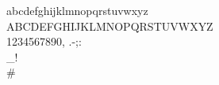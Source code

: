 \documentclass[preview]{standalone}
\begin{document}
\begin{center}
abcdefghijklmnopqrstuvwxyz\\ABCDEFGHIJKLMNOPQRSTUVWXYZ\\1234567890, .-;:\\_!\"\\#\\%
\end{center}
\end{document}
